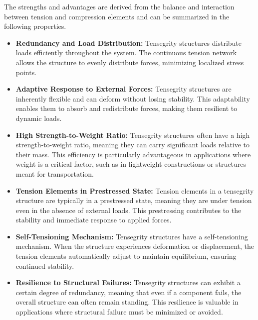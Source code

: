 \documentclass{article}
\begin{document}
The strengths and advantages are derived from the balance and interaction between tension and compression elements \cite{Ref_Skelton_2001_introduction} and can be summarized in the following properties.

\begin{itemize}
    \item{{\bf Redundancy and Load Distribution:} Tensegrity structures
            distribute loads efficiently throughout the system. The continuous tension network allows the structure to evenly distribute forces, minimizing localized stress points.}
    \item{{\bf Adaptive Response to External Forces:}
            Tensegrity structures are inherently flexible and can deform without losing stability. This adaptability enables them to absorb and redistribute forces, making them resilient to dynamic loads.}
    \item{{\bf High Strength-to-Weight Ratio:}
            Tensegrity structures often have a high strength-to-weight ratio, meaning they can carry significant loads relative to their mass. This efficiency is particularly advantageous in applications where weight is a critical factor, such as in lightweight constructions or structures meant for transportation.}
    \item{{\bf Tension Elements in Prestressed State:}
           Tension elements in a tensegrity structure are typically in a prestressed state, meaning they are under tension even in the absence of external loads. This prestressing contributes to the stability and immediate response to applied forces.}
    \item{{\bf Self-Tensioning Mechanism:}
           Tensegrity structures have a self-tensioning mechanism. When the structure experiences deformation or displacement, the tension elements automatically adjust to maintain equilibrium, ensuring continued stability.}
    \item{{\bf Resilience to Structural Failures:}
        Tensegrity structures can exhibit a certain degree of redundancy, meaning that even if a component fails, the overall structure can often remain standing. This resilience is valuable in applications where structural failure must be minimized or avoided.}
\end{itemize}
\end{document}
